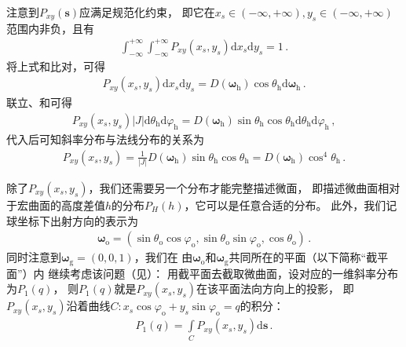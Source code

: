 注意到$P_{xy}({\bm s})$应满足规范化约束，
即它在$x_s\in(-\infty,+\infty),y_s\in(-\infty,+\infty)$范围内非负，且有
\begin{align}\label{eq:08-ex01-normal-of-P2D}
    \int_{-\infty}^{+\infty}\int_{-\infty}^{+\infty}
    P_{xy}(x_s,y_s)\mathrm{d}x_s\mathrm{d}y_s=1\, .
\end{align}
将上式和比对，可得
\begin{align}\label{eq:08-ex01-P2D}
    P_{xy}(x_s,y_s)\mathrm{d}x_s\mathrm{d}y_s=
    D({\bm\omega}_{\mathrm{h}})\cos\theta_{\mathrm{h}}\mathrm{d}{\bm\omega}_{\mathrm{h}}\, .
\end{align}
联立、和可得
\begin{align}
    P_{xy}(x_s,y_s)|J|\mathrm{d}\theta_{\mathrm{h}}\mathrm{d}\varphi_{\mathrm{h}}
    =D({\bm\omega}_{\mathrm{h}})\sin\theta_{\mathrm{h}}\cos\theta_{\mathrm{h}}\mathrm{d}\theta_{\mathrm{h}}\mathrm{d}\varphi_{\mathrm{h}}\, ,
\end{align}
代入后可知斜率分布与法线分布的关系为
\begin{align}\label{eq:08-ex01-relation-P2D-McrofacetDistribution}
    P_{xy}(x_s,y_s)=\frac{1}{|J|}D({\bm\omega}_{\mathrm{h}})\sin\theta_{\mathrm{h}}\cos\theta_{\mathrm{h}}
    =D({\bm\omega}_{\mathrm{h}})\cos^4\theta_{\mathrm{h}}\, .
\end{align}

除了$P_{xy}(x_s,y_s)$，我们还需要另一个分布才能完整描述微面，
即描述微曲面相对于宏曲面的高度差值$h$的分布$P_H(h)$，它可以是任意合适的分布。
此外，我们记球坐标下出射方向的表示为
\begin{align}
    {\bm\omega}_{\mathrm{o}}=(\sin\theta_{\mathrm{o}}\cos\varphi_{\mathrm{o}},\sin\theta_{\mathrm{o}}\sin\varphi_{\mathrm{o}},\cos\theta_{\mathrm{o}})\, .
\end{align}
同时注意到${\bm\omega}_{\mathrm{g}}=(0,0,1)$，我们在
由${\bm\omega}_{\mathrm{o}}$和${\bm\omega}_{\mathrm{g}}$共同所在的平面（以下简称“截平面”）内
继续考虑该问题（见）：
用截平面去截取微曲面，设对应的一维斜率分布为$P_1(q)$，
则$P_1(q)$就是$P_{xy}(x_s,y_s)$在该平面法向方向上的投影，
即$P_{xy}(x_s,y_s)$沿着曲线$C:x_s\cos\varphi_{\mathrm{o}}+y_s\sin\varphi_{\mathrm{o}}=q$的积分：
\begin{align}
    P_1(q)=\int\limits_{C}P_{xy}(x_s,y_s)\mathrm{d}{\bm s}\, .
\end{align}

